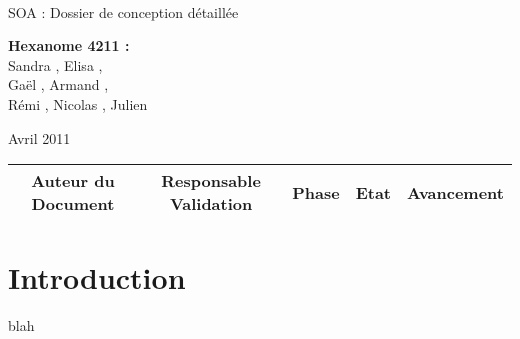 \documentclass[a4paper]{article}
\begin{document}
\begin{titlepage}
~ 
\vfill
	\begin{center}
		\begin{Huge}
		SOA : Dossier de conception détaillée\\
		\end{Huge} 
\vfill
		\textbf{Hexanome 4211 :} 
		\\Sandra {}, Elisa , 
		\\Gaël , Armand , 
		\\Rémi , Nicolas , Julien \\

\vfill		
		\begin{Large}
		Avril 2011
		\end{Large}
\vfill
	\begin{tabular}{|c|c|c|c|c|}
 	 \hline
 	 Auteur du Document & Responsable Validation & Phase & Etat & Avancement \\
 	 \hline
 	 
 	\hline
 	
	\end{tabular}
\vfill	
	\end{center}
\vfill
\end{titlepage}

\newpage
\tableofcontents
\newpage


\section*{Introduction}
blah





\end{document}
